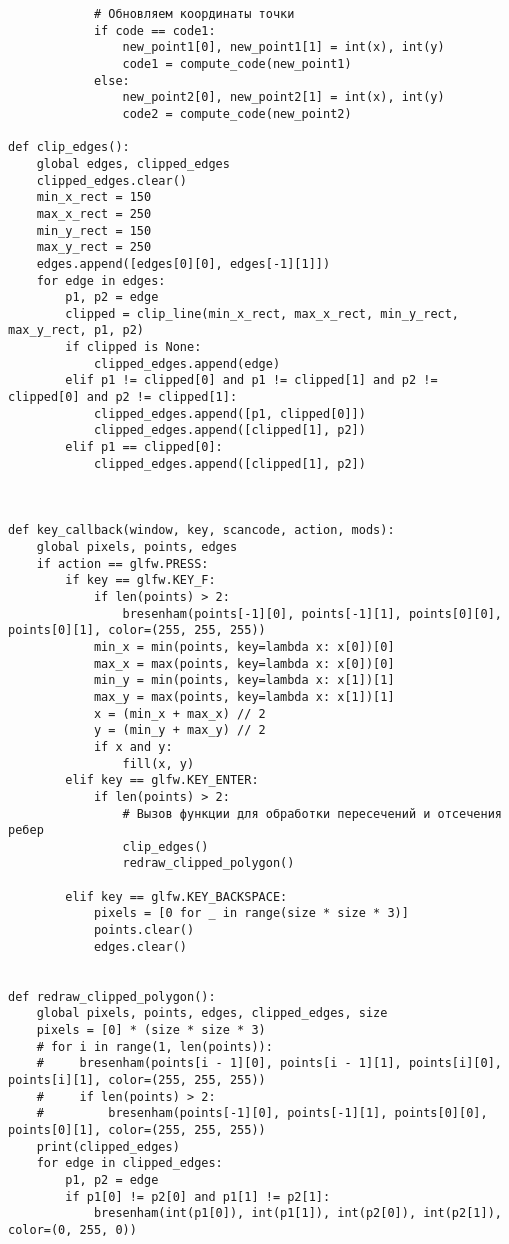 \documentclass[a4paper, 14pt]{extarticle}
\begin{document}
\begin{lstlisting}
            # Обновляем координаты точки
            if code == code1:
                new_point1[0], new_point1[1] = int(x), int(y)
                code1 = compute_code(new_point1)
            else:
                new_point2[0], new_point2[1] = int(x), int(y)
                code2 = compute_code(new_point2)

def clip_edges():
    global edges, clipped_edges
    clipped_edges.clear()
    min_x_rect = 150
    max_x_rect = 250
    min_y_rect = 150
    max_y_rect = 250
    edges.append([edges[0][0], edges[-1][1]])
    for edge in edges:
        p1, p2 = edge
        clipped = clip_line(min_x_rect, max_x_rect, min_y_rect, max_y_rect, p1, p2)
        if clipped is None:
            clipped_edges.append(edge)
        elif p1 != clipped[0] and p1 != clipped[1] and p2 != clipped[0] and p2 != clipped[1]:
            clipped_edges.append([p1, clipped[0]])
            clipped_edges.append([clipped[1], p2])
        elif p1 == clipped[0]:
            clipped_edges.append([clipped[1], p2])



def key_callback(window, key, scancode, action, mods):
    global pixels, points, edges
    if action == glfw.PRESS:
        if key == glfw.KEY_F:
            if len(points) > 2:
                bresenham(points[-1][0], points[-1][1], points[0][0], points[0][1], color=(255, 255, 255))
            min_x = min(points, key=lambda x: x[0])[0]
            max_x = max(points, key=lambda x: x[0])[0]
            min_y = min(points, key=lambda x: x[1])[1]
            max_y = max(points, key=lambda x: x[1])[1]
            x = (min_x + max_x) // 2
            y = (min_y + max_y) // 2
            if x and y:
                fill(x, y)
        elif key == glfw.KEY_ENTER:
            if len(points) > 2:
                # Вызов функции для обработки пересечений и отсечения ребер
                clip_edges()
                redraw_clipped_polygon()

        elif key == glfw.KEY_BACKSPACE:
            pixels = [0 for _ in range(size * size * 3)]
            points.clear()
            edges.clear()


def redraw_clipped_polygon():
    global pixels, points, edges, clipped_edges, size
    pixels = [0] * (size * size * 3)
    # for i in range(1, len(points)):
    #     bresenham(points[i - 1][0], points[i - 1][1], points[i][0], points[i][1], color=(255, 255, 255))
    #     if len(points) > 2:
    #         bresenham(points[-1][0], points[-1][1], points[0][0], points[0][1], color=(255, 255, 255))
    print(clipped_edges)
    for edge in clipped_edges:
        p1, p2 = edge
        if p1[0] != p2[0] and p1[1] != p2[1]:
            bresenham(int(p1[0]), int(p1[1]), int(p2[0]), int(p2[1]), color=(0, 255, 0))



\end{lstlisting}
\end{document}
